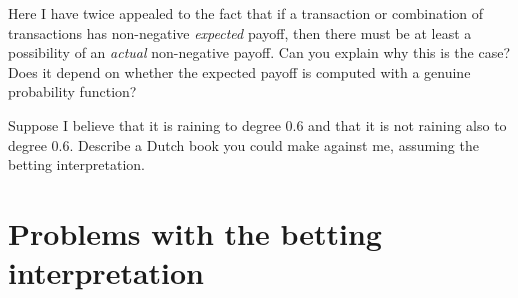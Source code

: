 \begin{exercise}{2}
  Here I have twice appealed to the fact that if a transaction or combination of
  transactions has non-negative \emph{expected} payoff, then there must be at
  least a possibility of an \emph{actual} non-negative payoff. Can you explain
  why this is the case? Does it depend on whether the expected payoff is
  computed with a genuine probability function?
\end{exercise}

\begin{exercise}{2}
  Suppose I believe that it is raining to degree 0.6 and that it is
  not raining also to degree 0.6. Describe a Dutch book you could make
  against me, assuming the betting interpretation.
\end{exercise}



\section{Problems with the betting interpretation}\label{sec:problem-betting}

